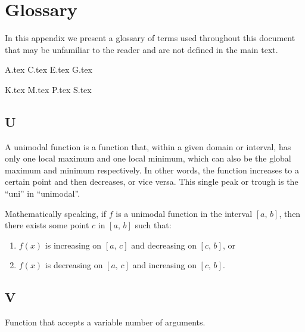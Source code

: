 \chapter{Glossary}
\label{appendix:glossary}
  In this appendix we present a glossary of terms used throughout this document 
  that may be unfamiliar to the reader and are not defined in the main text.

  {A.tex}
  {C.tex}
  {E.tex}
  {G.tex}
    
  {K.tex}
  {M.tex}
  {P.tex}
  {S.tex}

  \section*{U}
    \begin{definition}
    \label{def:unimodal_function}
      A unimodal function is a function that, within a given domain or interval,
      has only one local maximum and one local minimum, which can also be the
      global maximum and minimum respectively.
      In other words, the function increases to a certain point and then 
      decreases, or vice versa.
      This single peak or trough is the \enquote{uni} in \enquote{unimodal}.

      Mathematically speaking, if \(f\) is a unimodal function in the interval 
      \([a,\, b]\), then there exists some point \(c\) in \([a,\, b]\) such 
      that:

      \begin{enumerate}
        \item \(f(x)\) is increasing on \([a,\, c]\) and decreasing on \([c,\, 
          b]\), or
        \item \(f(x)\) is decreasing on \([a,\, c]\) and increasing on \([c,\,
          b]\).
      \end{enumerate}
    \end{definition}

  \section*{V}
    \begin{definition}
    \label{def:variadic_function}
      Function that accepts a variable number of arguments.
    \end{definition}

